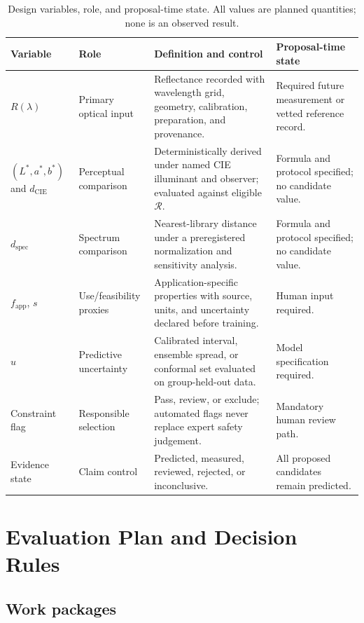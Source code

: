 \documentclass[conference]{IEEEtran}
\begin{document}
\begin{table}[!t]
\caption{Design variables, role, and proposal-time state. All values are planned quantities; none is an observed result.}
\label{tab:variables}
\centering
\renewcommand{\arraystretch}{1.22}
\begin{tabular}{|P{0.16\textwidth}|P{0.15\textwidth}|P{0.29\textwidth}|P{0.14\textwidth}|}
\hline
\textbf{Variable} & \textbf{Role} & \textbf{Definition and control} & \textbf{Proposal-time state} \\
\hline
$R(\lambda)$ & Primary optical input & Reflectance recorded with wavelength grid, geometry, calibration, preparation, and provenance. & Required future measurement or vetted reference record. \\
\hline
$(L^*,a^*,b^*)$ and $d_{\mathrm{CIE}}$ & Perceptual comparison & Deterministically derived under named CIE illuminant and observer; evaluated against eligible $\mathcal{R}$. & Formula and protocol specified; no candidate value. \\
\hline
$d_{\mathrm{spec}}$ & Spectrum comparison & Nearest-library distance under a preregistered normalization and sensitivity analysis. & Formula and protocol specified; no candidate value. \\
\hline
$f_{\mathrm{app}}$, $s$ & Use/feasibility proxies & Application-specific properties with source, units, and uncertainty declared before training. & Human input required. \\
\hline
$u$ & Predictive uncertainty & Calibrated interval, ensemble spread, or conformal set evaluated on group-held-out data. & Model specification required. \\
\hline
Constraint flag & Responsible selection & Pass, review, or exclude; automated flags never replace expert safety judgement. & Mandatory human review path. \\
\hline
Evidence state & Claim control & Predicted, measured, reviewed, rejected, or inconclusive. & All proposed candidates remain predicted. \\
\hline
\end{tabular}
\end{table}

\section{Evaluation Plan and Decision Rules}

\subsection{Work packages}
\end{document}

